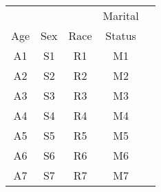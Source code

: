 \begin{tabular}{ccccc}
     &     &      & Marital \\
 Age & Sex & Race & Status \\
 A1  & S1  & R1   & M1  \\
 A2  & S2  & R2   & M2  \\
 A3  & S3  & R3   & M3  \\
 A4  & S4  & R4   & M4  \\
 A5  & S5  & R5   & M5  \\
 A6  & S6  & R6   & M6  \\
 A7  & S7  & R7   & M7  \\
\hline
\end{tabular}
